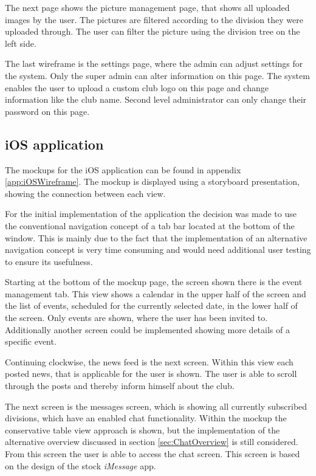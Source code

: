 The next page shows the picture management page, that shows all uploaded images by the user. The pictures are filtered according to the division they were uploaded through. The user can filter the picture using the division tree on the left side.

The last wireframe is the settings page, where the admin can adjust settings for the system. Only the super admin can alter information on this page. The system enables the user to upload a custom club logo on this page and change information like the club name. Second level administrator can only change their password on this page. 

\subsection{iOS application}
\label{sec:iOSMockup}
The mockups for the iOS application can be found in appendix \vref{app:iOSWireframe}. The mockup is displayed using a storyboard presentation, showing the connection between each view.

For the initial implementation of the application the decision was made to use the conventional navigation concept of a tab bar located at the bottom of the window. This is mainly due to the fact that the implementation of an alternative navigation concept is very time consuming and would need additional user testing to ensure its usefulness.

Starting at the bottom of the mockup page, the screen shown there is the event management tab. This view shows a calendar in the upper half of the screen and the list of events, scheduled for the currently selected date, in the lower half of the screen. Only events are shown, where the user has been invited to. Additionally another screen could be implemented showing more details of a specific event.

Continuing clockwise, the news feed is the next screen. Within this view each posted news, that is applicable for the user is shown. The user is able to scroll through the posts and thereby inform himself about the club.

The next screen is the messages screen, which is showing all currently subscribed divisions, which have an enabled chat functionality. Within the mockup the conservative table view approach is shown, but the implementation of the alternative overview discussed in section \vref{sec:ChatOverview} is still considered. From this screen the user is able to access the chat screen. This screen is based on the design of the stock \emph{iMessage} app.

